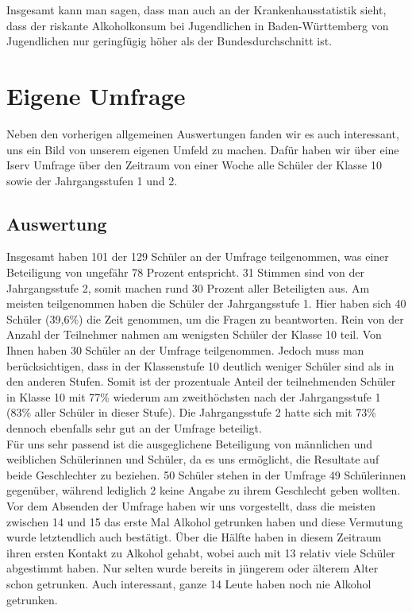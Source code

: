 \documentclass[12pt]{article}
\begin{document}
Insgesamt kann man sagen, dass man auch an der Krankenhausstatistik sieht, dass der riskante Alkoholkonsum bei Jugendlichen in Baden-Württemberg von Jugendlichen nur geringfügig höher als der Bundesdurchschnitt ist.

\section{Eigene Umfrage}
Neben den vorherigen allgemeinen Auswertungen fanden wir es auch interessant, uns ein Bild von unserem eigenen Umfeld zu machen. Dafür haben wir über eine Iserv Umfrage über den Zeitraum von einer Woche alle Schüler der Klasse 10 sowie der Jahrgangsstufen 1 und 2.
\subsection{Auswertung}
Insgesamt haben 101 der 129 Schüler an der Umfrage teilgenommen, was einer Beteiligung von ungefähr 78 Prozent entspricht.
31 Stimmen sind von der Jahrgangsstufe 2, somit machen rund 30 Prozent aller Beteiligten aus. Am meisten teilgenommen haben die Schüler der Jahrgangsstufe 1. Hier haben sich 40 Schüler (39,6\%) die Zeit genommen, um die Fragen zu beantworten. Rein von der Anzahl der Teilnehmer nahmen am wenigsten Schüler der Klasse 10 teil. Von Ihnen haben 30 Schüler an der Umfrage teilgenommen. 
Jedoch muss man berücksichtigen, dass in der Klassenstufe 10 deutlich weniger Schüler sind als in den anderen Stufen. Somit ist der prozentuale Anteil der teilnehmenden Schüler in Klasse 10 mit 77\% wiederum am zweithöchsten nach der Jahrgangsstufe 1 (83\% aller Schüler in dieser Stufe). Die Jahrgangsstufe 2 hatte sich mit 73\% dennoch ebenfalls sehr gut an der Umfrage beteiligt.\\
Für uns sehr passend ist die ausgeglichene Beteiligung von männlichen und weiblichen Schülerinnen und Schüler, da es uns ermöglicht, die Resultate auf beide Geschlechter zu beziehen. 50 Schüler stehen in der Umfrage 49 Schülerinnen gegenüber, während lediglich 2 keine Angabe zu ihrem Geschlecht geben wollten. 
Vor dem Absenden der Umfrage haben wir uns vorgestellt, dass die meisten zwischen 14 und 15 das erste Mal Alkohol getrunken haben und diese Vermutung wurde letztendlich auch bestätigt. Über die Hälfte haben in diesem Zeitraum ihren ersten Kontakt zu Alkohol gehabt, wobei auch mit 13 relativ viele Schüler abgestimmt haben. Nur selten wurde bereits in jüngerem oder älterem Alter schon getrunken. Auch interessant, ganze 14 Leute haben noch nie Alkohol getrunken. \\
\end{document}
